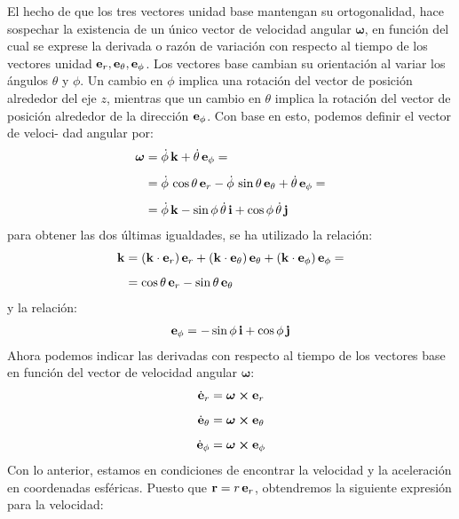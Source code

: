 El hecho de que los tres vectores unidad base mantengan su ortogonalidad, hace sospechar la existencia de un único vector de velocidad angular $\bm{\omega}$, en función del cual se exprese la derivada o razón de variación con respecto al tiempo de los vectores unidad $\vb{e}_{r}, \vb{e}_{\theta}, \vb{e}_{\phi}$. Los vectores base cambian su orientación al variar los ángulos $\theta$ y $\phi$. Un cambio en $\phi$ implica una rotación del vector de posición alrededor del eje $z$, mientras que un cambio en $\theta$ implica la rotación del vector de posición alrededor de la dirección $\vb{e}_{\phi}$. Con base en esto, podemos definir el vector de veloci- 
dad angular por:
\begin{align}
\begin{aligned}
\bm{\omega} &= \dot{\phi} \, \vb{k} + \dot{\theta} \, \vb{e}_{\phi} = \\[0.5em]
&= \dot{\phi} \, \cos \theta \, \vb{e}_{r} - \dot{\phi} \, \sin \theta \, \vb{e}_{\theta} + \dot{\theta} \, \vb{e}_{\phi} = \\[0.5em]
&= \dot{\phi} \, \vb{k} - \sin \phi \, \dot{\theta} \, \vb{i} + \cos \phi \, \dot{\theta} \, \vb{j}
\end{aligned}
\label{eq:ecuacion_02_47}
\end{align}
para obtener las dos últimas igualdades, se ha utilizado la relación:
\begin{align*}
    \vb{k} &= \left( \vb{k} \cdot \vb{e}_{r} \right) \vb{e}_{r} + \left( \vb{k} \cdot \vb{e}_{\theta} \right) \vb{e}_{\theta} + \left( \vb{k} \cdot \vb{e}_{\phi} \right) \vb{e}_{\phi} = \\[0.5em]
    &= \cos \theta \, \vb{e}_{r} - \sin \theta \, \vb{e}_{\theta}
\end{align*}
y la relación:
\begin{align*}
    \vb{e}_{\phi} = - \sin \phi \, \vb{i} + \cos \phi \, \vb{j}
\end{align*}
Ahora podemos indicar las derivadas con respecto al tiempo de los vectores base en función del vector de velocidad angular $\bm{\omega}$:
\begin{align}
    \dot{\vb{e}}_{r} &= \bm{\omega} \cp \vb{e}_{r} \label{eq:ecuacion_02_48} \\[0.5em]
    \dot{\vb{e}}_{\theta} &= \bm{\omega} \cp \vb{e}_{\theta} \label{eq:ecuacion_02_49} \\[0.5em]
    \dot{\vb{e}}_{\phi} &= \bm{\omega} \cp \vb{e}_{\phi} \label{eq:ecuacion_02_50}
\end{align}
Con lo anterior, estamos en condiciones de encontrar la velocidad y la aceleración en coordenadas esféricas. Puesto que $\vb{r} = r \, \vb{e}_{r}$, obtendremos la siguiente expresión para la velocidad:
